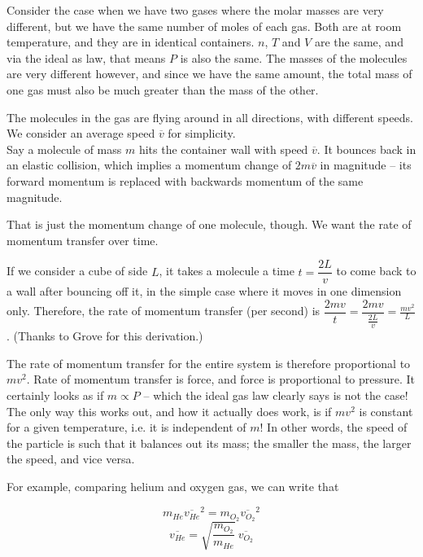 Consider the case when we have two gases where the molar masses are very different, but we have the same number of moles of each gas. Both are at room temperature, and they are in identical containers. $n$, $T$ and $V$ are the same, and via the ideal as law, that means $P$ is also the same. The masses of the molecules are very different however, and since we have the same amount, the total mass of one gas must also be much greater than the mass of the other.

The molecules in the gas are flying around in all directions, with different speeds. We consider an average speed $\overbar{v}$ for simplicity.\\
Say a molecule of mass $m$ hits the container wall with speed $\overbar{v}$. It bounces back in an elastic collision, which implies a momentum change of $2 m \overbar{v}$ in magnitude -- its forward momentum is replaced with backwards momentum of the same magnitude.

That is just the momentum change of one molecule, though. We want the rate of momentum transfer over time.

If we consider a cube of side $L$, it takes a molecule a time $t = \dfrac{2 L}{v}$ to come back to a wall after bouncing off it, in the simple case where it moves in one dimension only. Therefore, the rate of momentum transfer (per second) is $\dfrac{2 m v}{t} = \dfrac{2 m v}{\frac{2 L}{v}} = \frac{m v^2}{L}$. (Thanks to Grove for this derivation.)

The rate of momentum transfer for the entire system is therefore proportional to $m v^2$. Rate of momentum transfer is force, and force is proportional to pressure. It certainly looks as if $m \propto P$ -- which the ideal gas law clearly says is not the case!\\
The only way this works out, and how it actually does work, is if $m v^2$ is constant for a given temperature, i.e. it is independent of $m$! In other words, the speed of the particle is such that it balances out its mass; the smaller the mass, the larger the speed, and vice versa.

For example, comparing helium and oxygen gas, we can write that

\begin{equation}
m_{He} \overbar{v_{He}}^2 = m_{O_2} \overbar{v_{O_2}}^2
\end{equation}
\begin{equation}
\overbar{v_{He}} = \sqrt{\frac{m_{O_2}}{m_{He}}}\ \overbar{v_{O_2}}
\end{equation}

